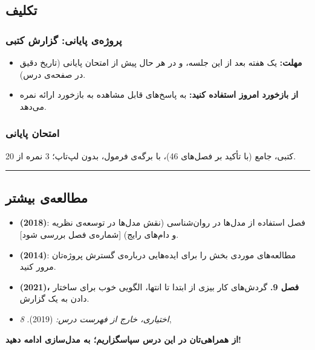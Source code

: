 
\subsection{تکلیف}

\subsubsection{پروژه‌ی پایانی: گزارش کتبی}

\begin{itemize}
\tightlist
\item
  \textbf{مهلت:} یک هفته بعد از این جلسه، و در هر حال پیش از امتحان
  پایانی (تاریخ دقیق در صفحه‌ی درس).
\item
  \textbf{از بازخورد امروز استفاده کنید:}  به پاسخ‌های قابل
  مشاهده به بازخورد ارائه نمره می‌دهد.
\end{itemize}

\subsubsection{امتحان پایانی}

کتبی، جامع (با تأکید بر فصل‌های 4\lr{--}6)، با برگه‌ی فرمول، بدون لپ‌تاپ؛ 3 نمره
از 20.

\begin{center}\rule{0.5\linewidth}{0.5pt}\end{center}

\subsection{مطالعه‌ی بیشتر}

\begin{itemize}
\tightlist
\item
  \textbf{ \lr{\&}  (2018)}: فصل استفاده از مدل‌ها
  در روان‌شناسی (نقش مدل‌ها در توسعه‌ی نظریه و دام‌های رایج) {[}شماره‌ی فصل
  بررسی شود{]}.
\item
  \textbf{ \lr{\&}  (2014)}: مطالعه‌های موردی بخش
   را برای ایده‌هایی درباره‌ی گسترش پروژه‌تان مرور کنید.
\item
  \textbf{ \lr{\&}  (2021)، فصل 9.} گردش‌های کار
  بیزی از ابتدا تا انتها، الگویی خوب برای ساختار دادن به یک گزارش.
\item
  \emph{اختیاری، خارج از فهرست درس:}  \lr{\&}  (2019).  \emph{ 8}, 
\end{itemize}

\textbf{از همراهی‌تان در این درس سپاسگزاریم؛ به مدل‌سازی ادامه دهید!}
